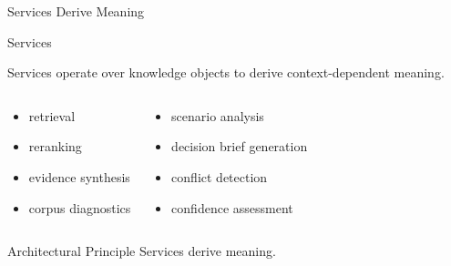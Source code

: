 \documentclass[aspectratio=169]{beamer}
\begin{document}

\begin{frame}{Services Derive Meaning}

\Large

\begin{block}{Services}

Services operate over knowledge objects to derive context-dependent meaning.

\end{block}

\vspace{0.35cm}

\small

\begin{columns}[T]


\begin{block}

\begin{itemize}
\item retrieval
\item reranking
\item evidence synthesis
\item corpus diagnostics
\end{itemize}

\end{block}


\begin{block}

\begin{itemize}
\item scenario analysis
\item decision brief generation
\item conflict detection
\item confidence assessment
\end{itemize}

\end{block}

\end{columns}

\vspace{0.3cm}

\begin{alertblock}{Architectural Principle}
Services derive meaning.
\end{alertblock}

\end{frame}
\end{document}
